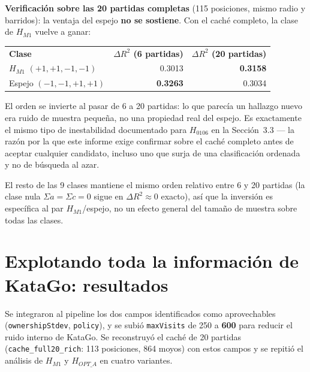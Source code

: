\documentclass[11pt, a4paper]{article}
\newcommand{\TH}[1]{\cellcolor{cTHbg}\color{white}\textbf{#1}}
\newcommand{\good}[1]{\color{cGood}\textbf{#1}}
\begin{document}
\begin{tcolorbox}[quotebox]
  \textbf{Verificaci\'on sobre las 20 partidas completas} (115
  posiciones, mismo radio y barridos): la ventaja del espejo
  \textbf{no se sostiene}. Con el cach\'e completo, la clase de
  $H_{M1}$ vuelve a ganar:

  \medskip
  \begin{center}
  \begin{tabular}{lrr}
    \TH{Clase} & \TH{$\Delta R^2$ (6 partidas)} & \TH{$\Delta R^2$ (20 partidas)} \\[1pt]
    $H_{M1}$ $(+1,+1,-1,-1)$ & 0.3013 & \good{0.3158} \\
    Espejo $(-1,-1,+1,+1)$   & \good{0.3263} & 0.3034 \\
  \end{tabular}
  \end{center}
  \medskip

  El orden se invierte al pasar de 6 a 20 partidas: lo que parec\'ia
  un hallazgo nuevo era ruido de muestra peque\~na, no una propiedad
  real del espejo. Es exactamente el mismo tipo de inestabilidad
  documentado para $H_{0106}$ en la Secci\'on~3.3 --- la raz\'on por
  la que este informe exige confirmar sobre el cach\'e completo antes
  de aceptar cualquier candidato, incluso uno que surja de una
  clasificaci\'on ordenada y no de b\'usqueda al azar.
\end{tcolorbox}

El resto de las 9 clases mantiene el mismo orden relativo entre 6 y 20
partidas (la clase nula $\Sigma a=\Sigma c=0$ sigue en $\Delta R^2
\approx 0$ exacto), as\'i que la inversi\'on es espec\'ifica al par
$H_{M1}$/espejo, no un efecto general del tama\~no de muestra sobre
todas las clases.

\section{Explotando toda la informaci\'on de KataGo: resultados}
\label{sec:rich}

Se integraron al pipeline los dos campos identificados como
aprovechables (\texttt{ownershipStdev}, \texttt{policy}), y se subi\'o
\texttt{maxVisits} de 250 a \textbf{600} para reducir el ruido interno
de KataGo. Se reconstruy\'o el cach\'e de 20 partidas
(\texttt{cache\_full20\_rich}: 113 posiciones, 864 moyos) con estos
campos y se repiti\'o el an\'alisis de $H_{M1}$ y $H_{OPT\_A}$ en
cuatro variantes.
\end{document}
